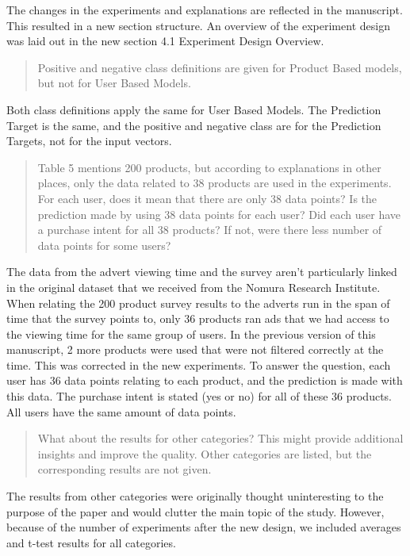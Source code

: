 \documentclass[review]{elsarticle}
\begin{document}
The changes in the experiments and explanations are reflected in the manuscript. This resulted in a new section structure. An overview of the experiment design was laid out in the new section 4.1 Experiment Design Overview.

\begin{quotation}
Positive and negative class definitions are given for Product Based models, but not for User Based Models.
\end{quotation}

Both class definitions apply the same for User Based Models. The Prediction Target is the same, and the positive and negative class are for the Prediction Targets, not for the input vectors. 

\begin{quotation}
Table 5 mentions 200 products, but according to explanations in other places, only the data related to 38 products are used in the experiments. For each user, does it mean that there are only 38 data points? Is the prediction made by using 38 data points for each user? Did each user have a purchase intent for all 38 products? If not, were there less number of data points for some users?
\end{quotation}

The data from the advert viewing time and the survey aren't particularly linked in the original dataset that we received from the Nomura Research Institute. When relating the 200 product survey results to the adverts run in the span of time that the survey points to, only 36 products ran ads that we had access to the viewing time for the same group of users. In the previous version of this manuscript, 2 more products were used that were not filtered correctly at the time. This was corrected in the new experiments. To answer the question, each user has 36 data points relating to each product, and the prediction is made with this data. The purchase intent is stated (yes or no) for all of these 36 products. All users have the same amount of data points.

\begin{quotation}
What about the results for other categories? This might provide additional insights and improve the quality. Other categories are listed, but the corresponding results are not given. 
\end{quotation}

The results from other categories were originally thought uninteresting to the purpose of the paper and would clutter the main topic of the study. However, because of the number of experiments after the new design, we included averages and t-test results for all categories. 
\end{document}
